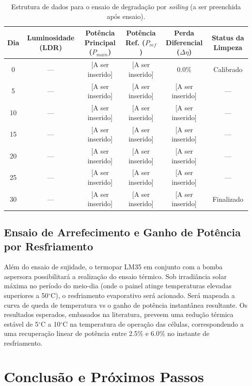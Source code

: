 \documentclass[12pt, a4paper]{article}
\begin{document}
\begin{table}[htbp]
    \centering
    \caption{Estrutura de dados para o ensaio de degradação por \textit{soiling} (a ser preenchida após ensaio).}
    \label{tab:ensaio_soiling}
    \begin{tabular}{cccccc}
    \toprule
    \textbf{Dia} & \textbf{Luminosidade (LDR)} & \textbf{Potência Principal ($P_{main}$)} & \textbf{Potência Ref. ($P_{ref}$)} & \textbf{Perda Diferencial ($\Delta \eta$)} & \textbf{Status da Limpeza} \\
    \midrule
    0 & --- & [A ser inserido] & [A ser inserido] & 0.0\% & Calibrado \\
    5 & --- & [A ser inserido] & [A ser inserido] & [A ser inserido] & --- \\
    10 & --- & [A ser inserido] & [A ser inserido] & [A ser inserido] & --- \\
    15 & --- & [A ser inserido] & [A ser inserido] & [A ser inserido] & --- \\
    20 & --- & [A ser inserido] & [A ser inserido] & [A ser inserido] & --- \\
    25 & --- & [A ser inserido] & [A ser inserido] & [A ser inserido] & --- \\
    30 & --- & [A ser inserido] & [A ser inserido] & [A ser inserido] & Finalizado \\
    \bottomrule
    \end{tabular}
\end{table}

\subsection{Ensaio de Arrefecimento e Ganho de Potência por Resfriamento}

Além do ensaio de sujidade, o termopar LM35 em conjunto com a bomba aspersora possibilitará a realização do ensaio térmico. Sob irradiância solar máxima no período do meio-dia (onde o painel atinge temperaturas elevadas superiores a 50$^\circ$C), o resfriamento evaporativo será acionado. Será mapeada a curva de queda de temperatura vs o ganho de potência instantânea resultante. Os resultados esperados, embasados na literatura, preveem uma redução térmica estável de 5$^\circ$C a 10$^\circ$C na temperatura de operação das células, correspondendo a uma recuperação linear de potência entre 2.5\% e 6.0\% no instante de resfriamento.

\section{Conclusão e Próximos Passos}
\end{document}
